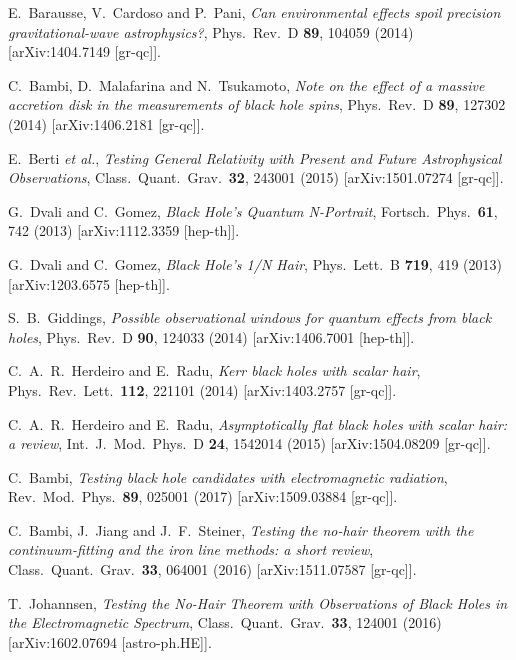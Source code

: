 \documentclass[11pt,a4paper,pdftex]{article}
\begin{document}
\begin{thebibliography}{99}
  E.~Barausse, V.~Cardoso and P.~Pani,
  {\it Can environmental effects spoil precision gravitational-wave astrophysics?},
  Phys.\ Rev.\ D {\bf 89}, 104059 (2014)
  [arXiv:1404.7149 [gr-qc]].

  C.~Bambi, D.~Malafarina and N.~Tsukamoto,
  {\it Note on the effect of a massive accretion disk in the measurements of black hole spins},
  Phys.\ Rev.\ D {\bf 89}, 127302 (2014)
  [arXiv:1406.2181 [gr-qc]]. 

  E.~Berti {\it et al.},
  {\it Testing General Relativity with Present and Future Astrophysical Observations},
  Class.\ Quant.\ Grav.\  {\bf 32}, 243001 (2015)
  [arXiv:1501.07274 [gr-qc]].

  G.~Dvali and C.~Gomez,
  {\it Black Hole's Quantum N-Portrait},
  Fortsch.\ Phys.\  {\bf 61}, 742 (2013)
  [arXiv:1112.3359 [hep-th]].

  G.~Dvali and C.~Gomez,
  {\it Black Hole's 1/N Hair},
  Phys.\ Lett.\ B {\bf 719}, 419 (2013)
  [arXiv:1203.6575 [hep-th]].

  S.~B.~Giddings,
  {\it Possible observational windows for quantum effects from black holes},
  Phys.\ Rev.\ D {\bf 90}, 124033 (2014)
  [arXiv:1406.7001 [hep-th]].

  C.~A.~R.~Herdeiro and E.~Radu,
  {\it Kerr black holes with scalar hair},
  Phys.\ Rev.\ Lett.\  {\bf 112}, 221101 (2014)
  [arXiv:1403.2757 [gr-qc]].

  C.~A.~R.~Herdeiro and E.~Radu,
  {\it Asymptotically flat black holes with scalar hair: a review},
  Int.\ J.\ Mod.\ Phys.\ D {\bf 24}, 1542014 (2015)
  [arXiv:1504.08209 [gr-qc]].  
  
  C.~Bambi,
  {\it Testing black hole candidates with electromagnetic radiation},
  Rev.\ Mod.\ Phys.\  {\bf 89}, 025001 (2017)
  [arXiv:1509.03884 [gr-qc]].
  
  C.~Bambi, J.~Jiang and J.~F.~Steiner,
  {\it Testing the no-hair theorem with the continuum-fitting and the iron line methods: a short review},
  Class.\ Quant.\ Grav.\  {\bf 33}, 064001 (2016)
  [arXiv:1511.07587 [gr-qc]].  
  
  T.~Johannsen,
  {\it Testing the No-Hair Theorem with Observations of Black Holes in the Electromagnetic Spectrum},
  Class.\ Quant.\ Grav.\  {\bf 33}, 124001 (2016)
  [arXiv:1602.07694 [astro-ph.HE]].  
  

\end{thebibliography}
\end{document}
